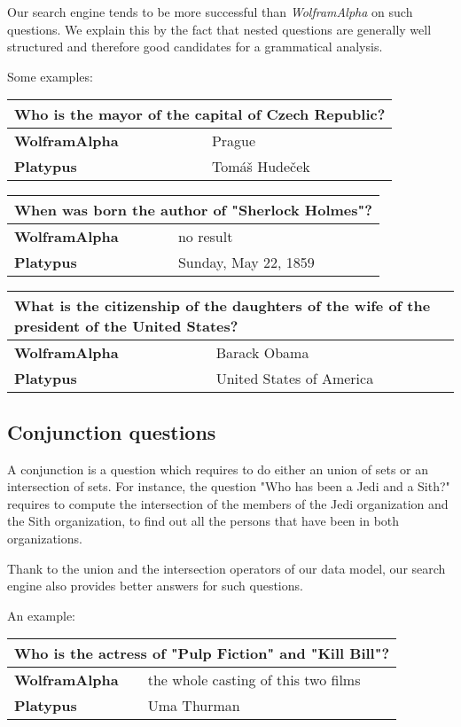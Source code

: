 Our search engine tends to be more successful than \emph{WolframAlpha}
on such questions. We explain this by the fact that nested questions are generally
well structured and therefore good candidates for a grammatical analysis.

Some examples:

\begin{tabular}{l|l}
    \multicolumn{2}{l}{Who is the mayor of the capital of Czech Republic?} \\
    \hline
    \textbf{WolframAlpha} & Prague\\
    \textbf{Platypus} & Tomáš Hudeček\\
\end{tabular}

\begin{tabular}{l|l}
    \multicolumn{2}{l}{When was born the author of "Sherlock Holmes"?} \\
    \hline
    \textbf{WolframAlpha} & no result\\
    \textbf{Platypus} & Sunday, May 22, 1859\\
\end{tabular}

\begin{tabular}{l|l}
    \multicolumn{2}{l}{What is the citizenship of the daughters of the wife of the president of the United States?} \\
    \hline
    \textbf{WolframAlpha} & Barack Obama\\
    \textbf{Platypus} & United States of America\\
\end{tabular}

\subsection{Conjunction questions}

A conjunction is a question which requires to do either an union of sets or an intersection
of sets. For instance, the question "Who has been a Jedi and a Sith?" requires to
compute the intersection of the members of the Jedi organization and the Sith organization,
to find out all the persons that have been in both organizations.

Thank to the union and the intersection operators of our data model, our search engine also
provides better answers for such questions.

An example:

\begin{tabular}{l|l}
    \multicolumn{2}{l}{Who is the actress of "Pulp Fiction" and "Kill Bill"?} \\
    \hline
    \textbf{WolframAlpha} & the whole casting of this two films\\
    \textbf{Platypus} & Uma Thurman\\
\end{tabular}


